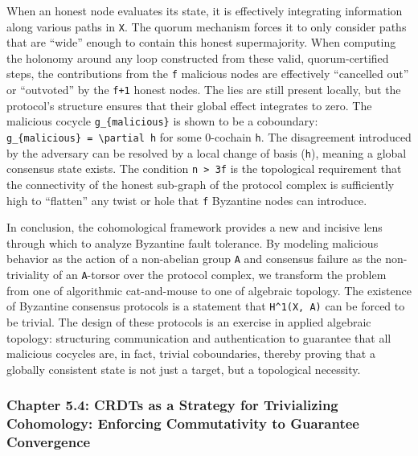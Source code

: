 \documentclass[
]{article}
\begin{document}
When an honest node evaluates its state, it is effectively integrating
information along various paths in \texttt{X}. The quorum mechanism
forces it to only consider paths that are ``wide'' enough to contain
this honest supermajority. When computing the holonomy around any loop
constructed from these valid, quorum-certified steps, the contributions
from the \texttt{f} malicious nodes are effectively ``cancelled out'' or
``outvoted'' by the \texttt{f+1} honest nodes. The lies are still
present locally, but the protocol's structure ensures that their global
effect integrates to zero. The malicious cocycle
\texttt{g\_\{malicious\}} is shown to be a coboundary:
\texttt{g\_\{malicious\}\ =\ \textbackslash{}partial\ h} for some
0-cochain \texttt{h}. The disagreement introduced by the adversary can
be resolved by a local change of basis (\texttt{h}), meaning a global
consensus state exists. The condition \texttt{n\ \textgreater{}\ 3f} is
the topological requirement that the connectivity of the honest
sub-graph of the protocol complex is sufficiently high to ``flatten''
any twist or hole that \texttt{f} Byzantine nodes can introduce.

In conclusion, the cohomological framework provides a new and incisive
lens through which to analyze Byzantine fault tolerance. By modeling
malicious behavior as the action of a non-abelian group \texttt{A} and
consensus failure as the non-triviality of an \texttt{A}-torsor over the
protocol complex, we transform the problem from one of algorithmic
cat-and-mouse to one of algebraic topology. The existence of Byzantine
consensus protocols is a statement that \texttt{H\^{}1(X,\ A)} can be
forced to be trivial. The design of these protocols is an exercise in
applied algebraic topology: structuring communication and authentication
to guarantee that all malicious cocycles are, in fact, trivial
coboundaries, thereby proving that a globally consistent state is not
just a target, but a topological necessity.

\subsubsection{Chapter 5.4: CRDTs as a Strategy for Trivializing
Cohomology: Enforcing Commutativity to Guarantee
Convergence}\label{chapter-5.4-crdts-as-a-strategy-for-trivializing-cohomology-enforcing-commutativity-to-guarantee-convergence}

\protect{}\label{chapter-5-4-CRDTs_as_a_Strategy_for_Trivializing_Coh}{}
\end{document}
